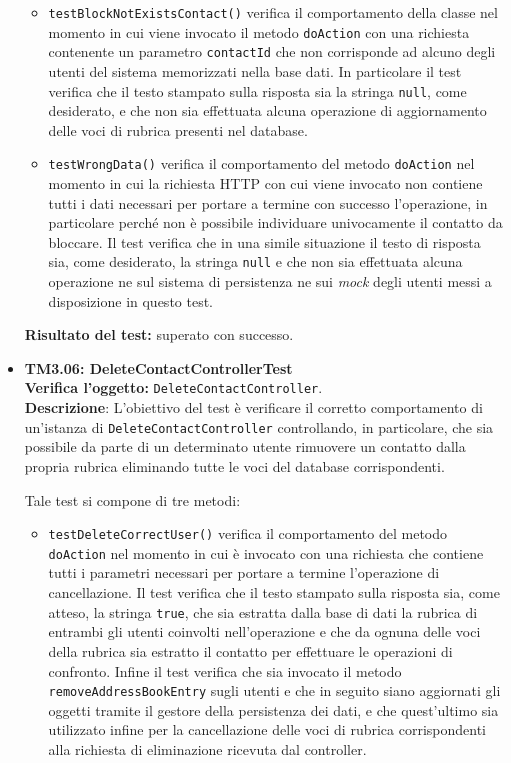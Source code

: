 \begin{itemize}
\begin{itemize}
\item \texttt{testBlockNotExistsContact()} verifica il comportamento della classe nel momento in cui viene invocato il metodo \texttt{doAction} con una richiesta contenente un parametro \texttt{contactId} che non corrisponde ad alcuno degli utenti del sistema memorizzati nella base dati. In particolare il test verifica che il testo stampato sulla risposta sia la stringa \texttt{null}, come desiderato, e che non sia effettuata alcuna operazione di aggiornamento delle voci di rubrica presenti nel database.

\item \texttt{testWrongData()} verifica il comportamento del metodo \texttt{doAction} nel momento in cui la richiesta HTTP con cui viene invocato non contiene tutti i dati necessari per portare a termine con successo l'operazione, in particolare perché non è possibile individuare univocamente il contatto da bloccare. Il test verifica che in una simile situazione il testo di risposta sia, come desiderato, la stringa \texttt{null} e che non sia effettuata alcuna operazione ne sul sistema di persistenza ne sui \textit{mock} degli utenti messi a disposizione in questo test.
\end{itemize}
\textbf{Risultato del test:} superato con successo.

\item[\passed] \textbf{TM3.06: DeleteContactControllerTest}\\
\textbf{Verifica l'oggetto:} \texttt{DeleteContactController}.\\
\textbf{Descrizione}: L'obiettivo del test è verificare il corretto comportamento di un'istanza di \texttt{DeleteContactController} controllando, in particolare, che sia possibile da parte di un determinato utente rimuovere un contatto dalla propria rubrica eliminando tutte le voci del database corrispondenti.

Tale test si compone di tre metodi:
\begin{itemize}
\item \texttt{testDeleteCorrectUser()} verifica il comportamento del metodo \texttt{doAction} nel momento in cui è invocato con una richiesta che contiene tutti i parametri necessari per portare a termine l'operazione di cancellazione. Il test verifica che il testo stampato sulla risposta sia, come atteso, la stringa \texttt{true}, che sia estratta dalla base di dati la rubrica di entrambi gli utenti coinvolti nell'operazione e che da ognuna delle voci della rubrica sia estratto il contatto per effettuare le operazioni di confronto. Infine il test verifica che sia invocato il metodo \texttt{removeAddressBookEntry} sugli utenti e che in seguito siano aggiornati gli oggetti tramite il gestore della persistenza dei dati, e che quest'ultimo sia utilizzato infine per la cancellazione delle voci di rubrica corrispondenti alla richiesta di eliminazione ricevuta dal controller.


\end{itemize}
\end{itemize}
